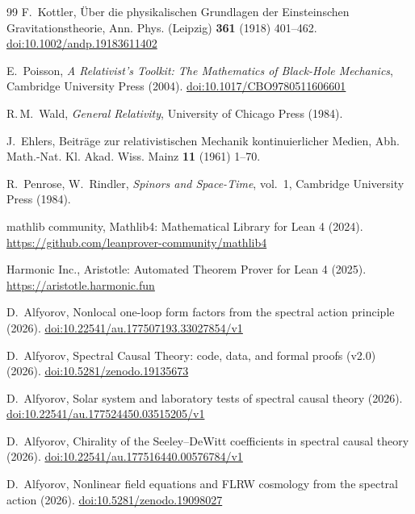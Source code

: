 \documentclass[12pt,a4paper]{article}
\theoremstyle{plain}
\theoremstyle{definition}
\theoremstyle{remark}
\begin{document}
\begin{thebibliography}{99}
F.~Kottler,
{\"U}ber die physikalischen Grundlagen der Einsteinschen Gravitationstheorie,
Ann. Phys. (Leipzig) \textbf{361} (1918) 401--462.
\href{https://doi.org/10.1002/andp.19183611402}{doi:10.1002/andp.19183611402}

E.~Poisson,
\textit{A Relativist's Toolkit: The Mathematics of Black-Hole Mechanics},
Cambridge University Press (2004).
\href{https://doi.org/10.1017/CBO9780511606601}{doi:10.1017/CBO9780511606601}

R.\,M.~Wald,
\textit{General Relativity},
University of Chicago Press (1984).

J.~Ehlers,
Beitr\"{a}ge zur relativistischen Mechanik kontinuierlicher Medien,
Abh. Math.-Nat. Kl. Akad. Wiss. Mainz \textbf{11} (1961) 1--70.

R.~Penrose, W.~Rindler,
\textit{Spinors and Space-Time}, vol.~1,
Cambridge University Press (1984).

{mathlib community},
Mathlib4: Mathematical Library for Lean 4 (2024).
\url{https://github.com/leanprover-community/mathlib4}

{Harmonic Inc.},
Aristotle: Automated Theorem Prover for Lean 4 (2025).
\url{https://aristotle.harmonic.fun}

D.~Alfyorov,
Nonlocal one-loop form factors from the spectral action principle (2026).
\href{https://doi.org/10.22541/au.177507193.33027854/v1}{doi:10.22541/au.177507193.33027854/v1}

D.~Alfyorov,
Spectral Causal Theory: code, data, and formal proofs (v2.0) (2026).
\href{https://doi.org/10.5281/zenodo.19135673}{doi:10.5281/zenodo.19135673}

D.~Alfyorov,
Solar system and laboratory tests of spectral causal theory (2026).
\href{https://doi.org/10.22541/au.177524450.03515205/v1}{doi:10.22541/au.177524450.03515205/v1}

D.~Alfyorov,
Chirality of the Seeley--DeWitt coefficients in spectral causal theory (2026).
\href{https://doi.org/10.22541/au.177516440.00576784/v1}{doi:10.22541/au.177516440.00576784/v1}

D.~Alfyorov,
Nonlinear field equations and FLRW cosmology from the spectral action (2026).
\href{https://doi.org/10.5281/zenodo.19098027}{doi:10.5281/zenodo.19098027}


\end{thebibliography}
\end{document}
